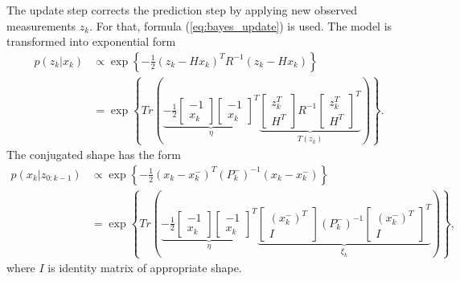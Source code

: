 The update step corrects the prediction step by applying new observed measurements $z_k$. For that, formula (\ref{eq:bayes_update}) is used. The model is transformed into exponential form
\begin{align}
    p(z_k|x_k) &\propto \exp \left\{-\frac{1}{2}(z_k - Hx_k)^T R^{-1} (z_k - Hx_k)\right \} \nonumber \\
    &= \exp
    \left\{
        Tr\left(
        \underbrace{
            -\frac{1}{2}
            \begin{bmatrix}
                -1 \\
                x_k
            \end{bmatrix}
            \begin{bmatrix}
                -1 \\
                x_k
            \end{bmatrix}^T
        }_{\eta}
        \underbrace{
            \begin{bmatrix}
                z_k^T \\
                H^T
            \end{bmatrix}
            R^{-1}
            \begin{bmatrix}
                z_k^T \\
                H^T
            \end{bmatrix}^T
        }_{T(z_k)}
        \right)
    \right\}.
\end{align}
The conjugated shape has the form
\begin{align}
    p(x_k|z_{0:k-1}) &\propto \exp
    \left\{-\frac{1}{2}(x_k - x_k^-)^T (P_k^-)^{-1} (x_k - x_k^-)\right \} \nonumber \\
    &= \exp
    \left\{
    Tr\left(
    \underbrace{
        -\frac{1}{2}
        \begin{bmatrix}
            -1 \\
            x_k
        \end{bmatrix}
        \begin{bmatrix}
            -1 \\
            x_k
        \end{bmatrix}^T
    }_{\eta}
    \underbrace{
        \begin{bmatrix}
            (x_k^-)^T \\
            I
        \end{bmatrix}
        (P_k^-)^{-1}
        \begin{bmatrix}
            (x_k^-)^T \\
            I
        \end{bmatrix}^T
    }_{\xi_k}
    \right)
    \right\},
\end{align}
where $I$ is identity matrix of appropriate shape.


